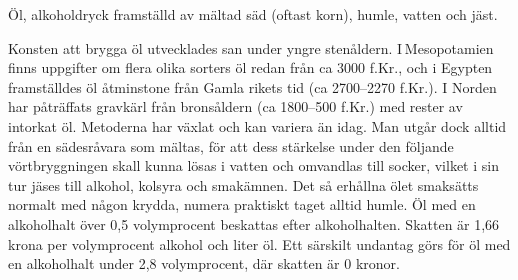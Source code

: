 \vspace{10pt}
Öl, alkoholdryck framställd av mältad säd (oftast korn), humle, vatten och jäst.

Konsten att brygga öl utvecklades san under yngre stenåldern. I Mesopotamien finns uppgifter om flera olika sorters öl redan från ca 3000 f.Kr., och i Egypten framställdes öl åtminstone från Gamla rikets tid (ca 2700–2270 f.Kr.).
I Norden har påträffats gravkärl från bronsåldern (ca 1800–500 f.Kr.) med rester av intorkat öl.
Metoderna har växlat och kan variera än idag. Man utgår dock alltid från en sädesråvara som mältas, för att dess stärkelse under den följande vörtbryggningen skall kunna lösas i vatten och omvandlas till socker, vilket i sin tur jäses till alkohol, kolsyra och smakämnen. Det så erhållna ölet smaksätts normalt med någon krydda, numera praktiskt taget alltid humle.
Öl med en alkoholhalt över 0,5 volymprocent beskattas efter alkoholhalten. Skatten är 1,66 krona per volymprocent alkohol och liter öl. Ett särskilt undantag görs för öl med en alkoholhalt under 2,8 volymprocent, där skatten är 0 kronor.
